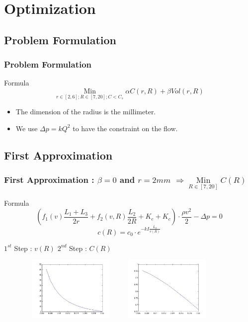 \documentclass[xcolor=dvipsnames,10pt]{beamer}
\begin{document}
\section{Optimization}

\subsection{Problem Formulation}
\begin{frame}
\frametitle{Problem Formulation}
\begin{block}{Formula}
\begin{equation}
\mathop{Min}\limits _{r\in [2,6];R\in [7,20];C<C_s} \alpha C(r,R) + \beta Vol(r,R) 
\end{equation}
\end{block}
\begin{itemize}
\item The dimension of the radius is the millimeter.\\
\item We use $\Delta p = kQ^2$ to have the constraint on the flow.
\end{itemize}
\end{frame}

\subsection{First Approximation}
\begin{frame}
\frametitle{First Approximation : $\beta = 0$ and $r=2mm$ $\Rightarrow \mathop{Min}\limits _{R\in [7,20]} C(R)$}
\begin{block}{Formula}
\begin{equation}
\left(f_1(v)\frac{L_1+L_3}{2r} + f_2(v,R)\frac{L_2}{2R} + K_e + K_c\right)\cdot \frac{\rho v^2}{2} - \Delta p = 0
\end{equation}
\begin{equation}
c(R) = c_0\cdot e^{-kI\frac{L_2}{v(R)}}
\end{equation}
\end{block}
$1^{st}$ Step : $v(R)$ \hspace{30mm} $2^{nd}$ Step : $C(R)$
	\begin{figure}
	\raggedleft
	\includegraphics[height=3.1cm, width=5cm]{./images/graphVR.jpg}
	\hspace{5mm}
	\raggedright
	\includegraphics[height=3.1cm, width=5cm]{./images/graphCR.jpg}
	\end{figure}
\end{frame}
\end{document}
